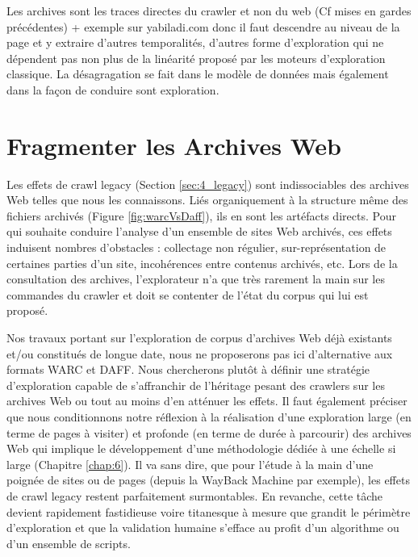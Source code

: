 \documentclass[symmetric,justified,marginals=raggedouter]{tufte-book}
\begin{document}
Les archives sont les traces directes du crawler et non du web (Cf mises en gardes précédentes) + exemple sur yabiladi.com donc il faut descendre au niveau de la page et y extraire d'autres temporalités, d'autres forme d'exploration qui ne dépendent pas non plus de la linéarité proposé par les moteurs d'exploration classique.
La désagragation se fait dans le modèle de données mais également dans la façon de conduire sont exploration. 


\chapter{Fragmenter les Archives Web}
\label{chap:5}

\par\noindent Les effets de crawl legacy (Section \ref{sec:4_legacy}) sont indissociables des archives Web telles que nous les connaissons. Liés organiquement à la structure même des fichiers archivés (Figure \ref{fig:warcVsDaff}), ils en sont les artéfacts directs. Pour qui souhaite conduire l'analyse d'un ensemble de sites Web archivés, ces effets induisent nombres d'obstacles : collectage non régulier, sur-représentation de certaines parties d'un site, incohérences entre contenus archivés, etc. Lors de la consultation des archives, l'explorateur n'a que très rarement la main sur les commandes du crawler et doit se contenter de l'état du corpus qui lui est proposé.

Nos travaux portant sur l'exploration de corpus d'archives Web déjà existants et/ou constitués de longue date, nous ne proposerons pas ici d'alternative aux formats WARC et DAFF. Nous chercherons plutôt à définir une stratégie d'exploration capable de s'affranchir de l'héritage pesant des crawlers sur les archives Web ou tout au moins d'en atténuer les effets. Il faut également préciser que nous conditionnons notre réflexion à la réalisation d'une exploration large (en terme de pages à visiter) et profonde (en terme de durée à parcourir) des archives Web qui implique le développement d'une méthodologie dédiée à une échelle si large (Chapitre \ref{chap:6}). Il va sans dire, que pour l'étude à la main d'une poignée de sites ou de pages (depuis la WayBack Machine par exemple), les effets de crawl legacy restent parfaitement surmontables. En revanche, cette tâche devient rapidement fastidieuse voire titanesque à mesure que grandit le périmètre d'exploration et que la validation humaine s'efface au profit d'un algorithme ou d'un ensemble de scripts.  
\end{document}
